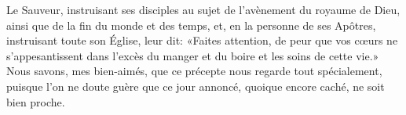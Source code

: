 Le Sauveur,
		instruisant ses disciples au sujet de l’avènement du royaume de Dieu,
	ainsi que de la fin du monde et des temps,
	et, en la personne de ses Apôtres, instruisant toute son Église,
	leur dit: «Faites attention, de peur que vos cœurs ne s’appesantissent
	dans l’excès du manger et du boire et les soins de cette vie.»
Nous savons, mes bien-aimés, que ce précepte nous regarde tout spécialement,
	puisque l’on ne doute guère que ce jour annoncé,
	quoique encore caché, ne soit bien proche.
